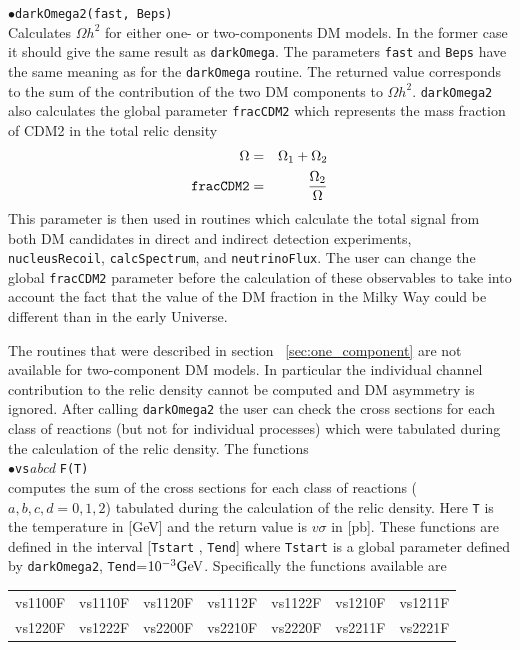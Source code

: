 \documentclass[12pt,a4paper]{article}
\begin{document}
$\bullet$\verb|darkOmega2(fast, Beps)|\\
Calculates $\Omega h^2$ for either  one- or  two-components DM models. In the former case it should give the same result as \verb|darkOmega|.
The parameters {\tt fast} and {\tt Beps} have the same meaning as for the {\tt darkOmega} routine.
The returned value corresponds to the sum of the contribution of the two  DM components to  $\Omega h^2$.  
 \verb|darkOmega2| also calculates the  global parameter {\tt fracCDM2} which represents the mass fraction of CDM2 
in the total relic density
\begin{eqnarray}
  \Omega &=& \Omega_1+\Omega_2\\
  \verb|fracCDM2|&=&\frac{\Omega_2}{\Omega}
\end{eqnarray}
This parameter is then used in routines which calculate the total signal from both  DM candidates in direct and indirect detection experiments,
 \verb|nucleusRecoil|, \verb|calcSpectrum|,  and \verb|neutrinoFlux|.  The user can change the global {\tt  fracCDM2} parameter before the calculation of these observables
to take into account the fact that the value of the DM fraction in the Milky Way could be different than   in the early Universe.

The routines that were described in section ~\ref{sec:one_component} are not available for two-component DM models. In particular the individual channel contribution to the relic density cannot be computed and DM asymmetry is ignored. 
 After calling  {\tt  darkOmega2}  the user can check the  cross sections  
for each class of reactions (but not for individual processes) which were tabulated during the calculation of the relic density. 
The functions\\
$\bullet$\verb|vs|{\it abcd} \verb|F(T)|\\
computes the sum of  the cross sections  
for each class of reactions ($a,b,c,d=0,1,2$) tabulated during the calculation of the relic density. 
Here  \verb|T| is the temperature in [GeV] and the 
return value is $v\sigma$ in [pb].  These functions are defined in the interval [{\tt Tstart} , {\tt Tend}] where
{\tt Tstart} is a global parameter defined by \verb|darkOmega2|, {\tt Tend}=$10^{-3}{\rm GeV}$. Specifically the functions available are

\begin{center}
\begin{tabular}{ l l l l l l l }
vs1100F & vs1110F & vs1120F&vs1112F&vs1122F&vs1210F&vs1211F\\
vs1220F&vs1222F&vs2200F&vs2210F&vs2220F&vs2211F& vs2221F
\end{tabular}
\end{center} 
\end{document}
